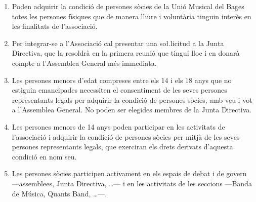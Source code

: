 \documentclass[11pt,a4paper]{article}
\newcommand{\UMB}{Unió Musical del Bages\xspace}
\newcommand{\JD}{Junta Directiva\xspace}
\newcommand{\AG}{Assemblea General\xspace}
\begin{document}

\begin{enumerate}
    \item Poden adquirir la condició de persones sòcies de la \UMB totes les persones físiques que de manera lliure i voluntària tinguin interès en les finalitats de l'associació.
    \item Per integrar-se a l'Associació cal presentar una so\l.licitud a la \JD, que la resoldrà en la primera reunió que tingui lloc i en donarà compte a l'\AG més immediata.
    \item Les persones menors d'edat compreses entre els 14 i els 18 anys que no estiguin emancipades necessiten el consentiment de les seves persones representants legals per adquirir la condició de persones sòcies, amb veu i vot a l'\AG. No poden ser elegides membres de la \JD.
    \item Les persones menors de 14 anys poden participar en les activitats de l'associació i adquirir la condició de persones sòcies per mitjà de les seves persones representants legals, que exerciran els drets derivats d'aquesta condició en nom seu.
    \item Les persones sòcies participen activament en els espais de debat i de govern ---assemblees, \JD, \ldots--- i en les activitats de les seccions ---Banda de Música, Quants Band, \ldots---.
\end{enumerate}

\end{document}
